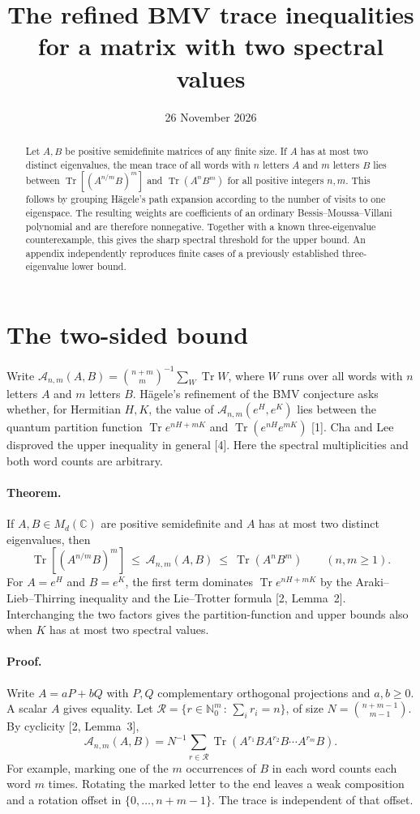 \documentclass[11pt]{article}
\title{The refined BMV trace inequalities for a matrix with two spectral values}
\date{26 November 2026}
\newcommand{\tr}{\operatorname{Tr}}
\newcommand{\av}{\mathcal A_{n,m}}
\begin{document}
\maketitle
\begin{abstract}
Let $A,B$ be positive semidefinite matrices of any finite size. If $A$ has
at most two distinct eigenvalues, the mean trace of all words with $n$
letters $A$ and $m$ letters $B$ lies between $\tr[(A^{n/m}B)^m]$ and
$\tr(A^nB^m)$ for all positive integers $n,m$. This follows by grouping
H\"agele's path expansion according to the number of visits to one eigenspace.
The resulting weights are coefficients of an ordinary Bessis--Moussa--Villani
polynomial and are therefore nonnegative. Together with a known
three-eigenvalue counterexample, this gives the sharp spectral threshold
for the upper bound. An appendix independently reproduces finite cases
of a previously established three-eigenvalue lower bound.
\end{abstract}

\section*{The two-sided bound}
Write $\av(A,B)=\binom{n+m}{m}^{-1}\sum_W\tr W$, where $W$ runs over all
words with $n$ letters $A$ and $m$ letters $B$. H\"agele's refinement of the
BMV conjecture asks whether, for Hermitian $H,K$, the value of
$\av(e^H,e^K)$ lies between the quantum partition function
$\tr e^{nH+mK}$ and $\tr(e^{nH}e^{mK})$ [1]. Cha and Lee disproved the
upper inequality in general [4]. Here the spectral multiplicities and
both word counts are arbitrary.

\paragraph{Theorem.}
If $A,B\in M_d(\mathbb C)$ are positive semidefinite and $A$ has at most
two distinct eigenvalues, then
\begin{equation}
 \tr[(A^{n/m}B)^m]\ \le\ \av(A,B)\ \le\ \tr(A^nB^m)
 \qquad(n,m\ge1).                                                    \label{eq:main}
\end{equation}
For $A=e^H$ and $B=e^K$, the first term dominates $\tr e^{nH+mK}$ by
the Araki--Lieb--Thirring inequality and the Lie--Trotter formula
[2, Lemma~2]. Interchanging the two factors gives the partition-function
and upper bounds also when $K$ has at most two spectral values.

\paragraph{Proof.}
Write $A=aP+bQ$ with $P,Q$ complementary orthogonal projections and
$a,b\ge0$. A scalar $A$ gives equality. Let
$\mathcal R=\{r\in\mathbb N_0^m\,:\,\sum_i r_i=n\}$, of size
$N=\binom{n+m-1}{m-1}$. By cyclicity [2, Lemma~3],
\[
 \av(A,B)=N^{-1}\sum_{r\in\mathcal R}
              \tr(A^{r_1}B A^{r_2}B\cdots A^{r_m}B).
\]
For example, marking one of the $m$ occurrences of $B$ in each word
counts each word $m$ times. Rotating the marked letter to the end leaves
a weak composition and a rotation offset in $\{0,\ldots,n+m-1\}$. The
trace is independent of that offset.
\end{document}
